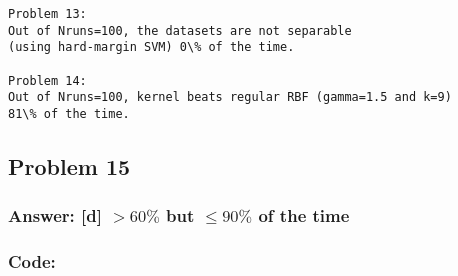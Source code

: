 \documentclass[11pt]{article}
\begin{document}
    \begin{Verbatim}[commandchars=\\\{\}]
Problem 13:
Out of Nruns=100, the datasets are not separable
(using hard-margin SVM) 0\% of the time.

Problem 14:
Out of Nruns=100, kernel beats regular RBF (gamma=1.5 and k=9)
81\% of the time.
    \end{Verbatim}

    \hypertarget{problem-15}{%
\subsection{Problem 15}\label{problem-15}}

\hypertarget{answer-d-60-but-le-90-of-the-time}{%
\subsubsection{\texorpdfstring{Answer: {[}d{]} \(> 60\%\) but
\(\le 90\%\) of the
time}{Answer: {[}d{]} \textgreater{} 60\textbackslash{}\% but \textbackslash{}le 90\textbackslash{}\% of the time}}\label{answer-d-60-but-le-90-of-the-time}}

\hypertarget{code}{%
\subsubsection{Code:}\label{code}}
\end{document}
